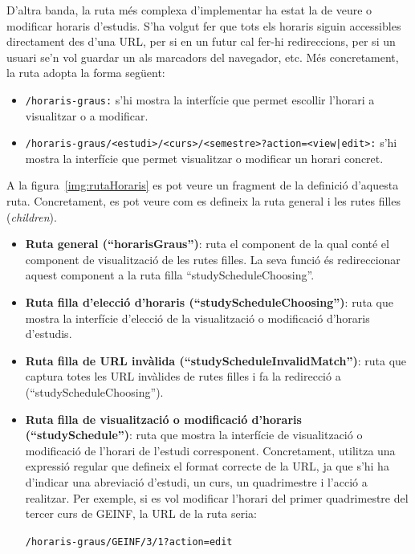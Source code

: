 \documentclass[a4paper,12pt]{ThesisStyle}
\begin{document}
D'altra banda, la ruta més complexa d'implementar ha estat la de veure o modificar horaris d'estudis. S'ha volgut fer que tots els horaris siguin accessibles directament des d'una URL, per si en un futur cal fer-hi redireccions, per si un usuari se'n vol guardar un als marcadors del navegador, etc. Més concretament, la ruta adopta la forma següent:
\begin{itemize}
  \item \texttt{/horaris-graus:} s'hi mostra la interfície que permet escollir l'horari a visualitzar o a modificar.
  \item \texttt{/horaris-graus/<estudi>/<curs>/<semestre>?action=<view|edit>:} s'hi mostra la interfície que permet visualitzar o modificar un horari concret.
\end{itemize}

A la figura~\ref{img:rutaHoraris} es pot veure un fragment de la definició d'aquesta ruta. Concretament, es pot veure com es defineix la ruta general i les rutes filles (\textit{children}).
\begin{itemize}
  \item \textbf{Ruta general (``horarisGraus'')}: ruta el component de la qual conté el component de visualització de les rutes filles. La seva funció és redireccionar aquest component a la ruta filla ``studyScheduleChoosing''.
  \item \textbf{Ruta filla d'elecció d'horaris (``studyScheduleChoosing'')}: ruta que mostra la interfície d'elecció de la visualització o modificació d'horaris d'estudis.
  \item \textbf{Ruta filla de URL invàlida (``studyScheduleInvalidMatch'')}: ruta que captura totes les URL invàlides de rutes filles i fa la redirecció a (``studyScheduleChoosing'').
  \item \textbf{Ruta filla de visualització o modificació d'horaris (``studySchedule'')}: ruta que mostra la interfície de visualització o modificació de l'horari de l'estudi corresponent. Concretament, utilitza una expressió regular que defineix el format correcte de la URL, ja que s'hi ha d'indicar una abreviació d'estudi, un curs, un quadrimestre i l'acció a realitzar. Per exemple, si es vol modificar l'horari del primer quadrimestre del tercer curs de GEINF, la URL de la ruta seria:\\[-0.6cm]
  \begin{center}
    \texttt{/horaris-graus/GEINF/3/1?action=edit}
  \end{center}
\end{itemize}
\end{document}
